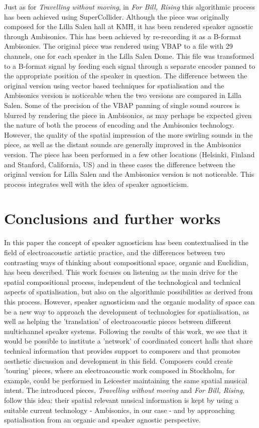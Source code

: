 \documentclass{article}
\begin{document}
     Just as for \textit{Travelling without moving}, in \textit{For Bill, Rising} this algorithmic process has been achieved using SuperCollider.
     Although the piece was originally composed for the Lilla Salen hall at KMH, it has been rendered speaker agnostic through Ambisonics. 
     This has been achieved by re-recording it as a B-format Ambisonics. 
     The original piece was rendered using VBAP to a file with 29 channels, one for each speaker in the Lilla Salen Dome. 
     This file was transformed to a B-format signal by feeding each signal through a separate encoder panned to the appropriate position of the speaker in question.
     The difference between the original version using vector based techniques for spatialisation and the Ambisonics version is noticeable when the two versions are compared in Lilla Salen. 
     Some of the precision of the VBAP panning of single sound sources is blurred by rendering the piece in Ambisonics, as may perhaps be expected given the nature of both the process of encoding and the Ambisonics technology.
     However, the quality of the spatial impression of the more swirling sounds in the piece, as well as the distant sounds are generally improved in the Ambisonics version.
     The piece has been performed in a few other locations (Helsinki, Finland and Stanford, California, US) and in these cases the difference between the original version for Lilla Salen and the Ambisonics version is not noticeable.
     This process integrates well with the idea of speaker agnosticism.
 
	\section{Conclusions and further works}

    In this paper the concept of speaker agnosticism has been contextualised in the field of electroacoustic artistic practice, and the differences between two contrasting ways of thinking about compositional space, organic and Euclidian, has been described. 
    This work focuses on listening as the main drive for the spatial compositional process, independent of the technological and technical aspects of spatialisation, but also on the algorithmic possibilities as derived from this process. 
    However, speaker agnosticism and the organic modality of space can be a new way to approach the development of technologies for spatialisation, as well as helping the 'translation' of electroacoustic pieces between different multichannel speaker systems. 
    Following the results of this work,  we see that it would be possible to institute a 'network' of coordinated concert halls that share technical information that provides support to composers and that promotes aesthetic discussion and development in this field. 
    Composers could create 'touring' pieces, where an electroacoustic work composed in Stockholm, for example, could be performed in Leicester maintaining the same spatial musical intent. 
    The introduced pieces, \textit{Travelling without moving} and \textit{For Bill, Rising}, follow this idea: their spatial relevant musical information is kept by using a suitable current technology - Ambisonics, in our case - and by approaching spatialisation from an organic and speaker agnostic perspective.
\end{document}
